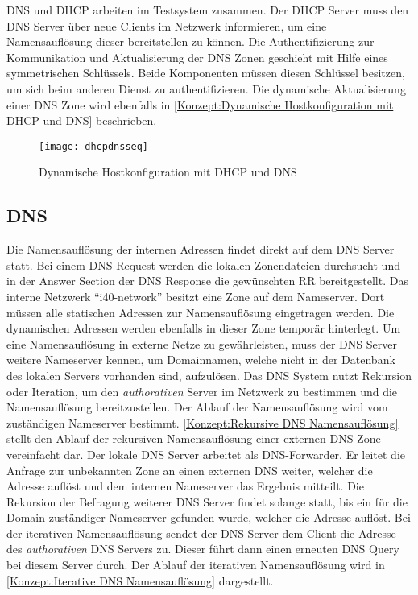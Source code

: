 \ac{DNS} und \ac{DHCP} arbeiten im Testsystem zusammen. Der \ac{DHCP} Server muss den \ac{DNS} Server über neue Clients im Netzwerk informieren, um eine Namensauflösung dieser bereitstellen zu können. Die Authentifizierung zur Kommunikation und Aktualisierung der \ac{DNS} Zonen geschieht mit Hilfe eines symmetrischen Schlüssels. Beide Komponenten müssen diesen Schlüssel besitzen, um sich beim anderen Dienst zu authentifizieren. Die dynamische Aktualisierung einer \ac{DNS} Zone wird ebenfalls in \autoref{Konzept:Dynamische Hostkonfiguration mit DHCP und DNS} beschrieben.

\begin{figure}[h]
  \centering
  \texttt{[image: dhcpdnsseq]}
  \caption{Dynamische Hostkonfiguration mit DHCP und DNS} 
  \label{Konzept:Dynamische Hostkonfiguration mit DHCP und DNS}
\end{figure}

\subsection{\ac{DNS}}
Die Namensauflösung der internen Adressen findet direkt auf dem \ac{DNS} Server statt. Bei einem \ac{DNS} Request werden die lokalen Zonendateien durchsucht und in der Answer Section der \ac{DNS} Response die gewünschten \ac{RR} bereitgestellt. Das interne Netzwerk "`i40-network"' besitzt eine Zone auf dem Nameserver. Dort müssen alle statischen Adressen zur Namensauflösung eingetragen werden. Die dynamischen Adressen werden ebenfalls in dieser Zone temporär hinterlegt. Um eine Namensauflösung in externe Netze zu gewährleisten, muss der \ac{DNS} Server weitere Nameserver kennen, um Domainnamen, welche nicht in der Datenbank des lokalen Servers vorhanden sind, aufzulösen. Das \ac{DNS} System nutzt Rekursion oder Iteration, um den \textit{authorativen} Server im Netzwerk zu bestimmen und die Namensauflösung bereitzustellen. Der Ablauf der Namensauflösung wird vom zuständigen Nameserver bestimmt. \autoref{Konzept:Rekursive DNS Namensauflösung} stellt den Ablauf der rekursiven Namensauflösung einer externen \ac{DNS} Zone vereinfacht dar. Der lokale \ac{DNS} Server arbeitet als \ac{DNS}-Forwarder. Er leitet die Anfrage zur unbekannten Zone an einen externen \ac{DNS} weiter, welcher die Adresse auflöst und dem internen Nameserver das Ergebnis mitteilt. Die Rekursion der Befragung weiterer \ac{DNS} Server findet solange statt, bis ein für die Domain zuständiger Nameserver gefunden wurde, welcher die Adresse auflöst. Bei der iterativen Namensauflösung sendet der \ac{DNS} Server dem Client die Adresse des \textit{authorativen} \ac{DNS} Servers zu. Dieser führt dann einen erneuten \ac{DNS} Query bei diesem Server durch. Der Ablauf der iterativen Namensauflösung wird in \autoref{Konzept:Iterative DNS Namensauflösung} dargestellt.

